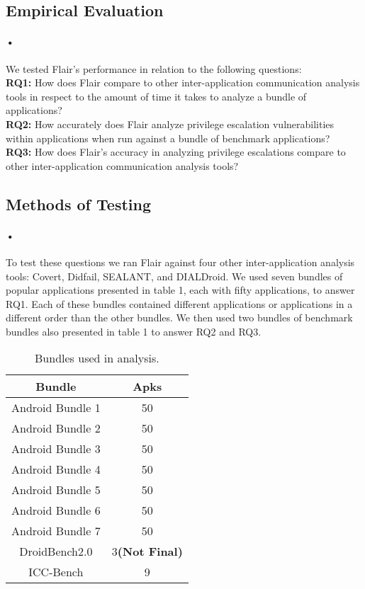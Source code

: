 \documentclass[twocolumn]{article}
\begin{document}
\begin{center}
\section[2]{Empirical Evaluation}
\end{center}

\paragraph{•}
	We tested Flair's performance in relation to the following questions:\\
	\textbf{RQ1:} How does Flair compare to other inter-application communication analysis tools in respect to the amount of time it takes to analyze a bundle of applications?\\
	\textbf{RQ2:} How accurately does Flair analyze privilege escalation vulnerabilities within applications when run against a bundle of benchmark applications?\\
	\textbf{RQ3:} How does Flair's accuracy in analyzing privilege escalations compare to other inter-application communication analysis tools?\\

\subsection{Methods of Testing} \label{methods}
\paragraph{•}
	To test these questions we ran Flair against four other inter-application analysis tools: Covert, Didfail, SEALANT, and DIALDroid. We used seven bundles of popular applications presented in table 1, each with fifty applications, to answer RQ1. Each of these bundles contained different applications or applications in a different order than the other bundles. We then used two bundles of benchmark bundles also presented in table 1 to answer RQ2 and RQ3. 

\begin{table}[h]
\begin{center}
\begin{tabular}{ |c c| }
	\hline
	Bundle & Apks\\
	\hline
	Android Bundle 1 & 50\\
	Android Bundle 2 & 50\\
	Android Bundle 3 & 50\\
	Android Bundle 4 & 50\\
	Android Bundle 5 & 50\\
	Android Bundle 6 & 50\\
	Android Bundle 7 & 50\\
	DroidBench2.0 & 3\textbf{(Not Final)}\\
	ICC-Bench & 9\\
	\hline
\end{tabular}
\end{center}
\caption{Bundles used in analysis.}
\label{table:1}
\end{table}
\end{document}
